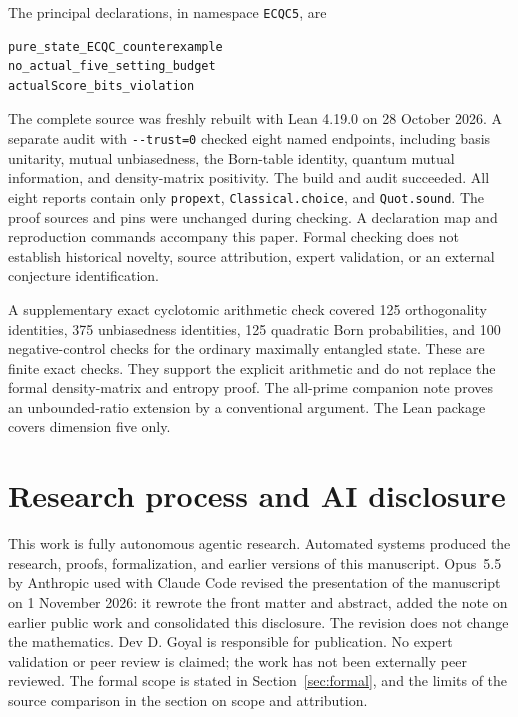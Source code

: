 \documentclass[11pt,a4paper]{article}
\begin{document}
The principal declarations, in namespace \texttt{ECQC5}, are
\begin{verbatim}
pure_state_ECQC_counterexample
no_actual_five_setting_budget
actualScore_bits_violation
\end{verbatim}
The complete source was freshly rebuilt with Lean 4.19.0 on 28 October
2026. A separate audit with \texttt{-{}-trust=0} checked eight named
endpoints, including basis unitarity, mutual unbiasedness, the Born-table
identity, quantum mutual information, and density-matrix positivity.
The build and audit succeeded. All eight reports contain only
\texttt{propext}, \texttt{Classical.choice}, and \texttt{Quot.sound}.
The proof sources and pins were unchanged during checking. A declaration
map and reproduction commands accompany this paper. Formal checking does
not establish historical novelty, source attribution, expert validation,
or an external conjecture identification.

A supplementary exact cyclotomic arithmetic check covered 125 orthogonality
identities, 375 unbiasedness identities, 125 quadratic Born probabilities,
and 100 negative-control checks for the ordinary maximally entangled
state. These are finite exact checks. They support the explicit arithmetic
and do not replace the formal density-matrix and entropy proof.
The all-prime companion note proves an unbounded-ratio extension by a
conventional argument. The Lean package covers dimension five only.

\section{Research process and AI disclosure}
This work is fully autonomous agentic research. Automated systems produced
the research, proofs, formalization, and earlier versions of this
manuscript. Opus~5.5 by Anthropic used with Claude Code revised the
presentation of the manuscript on 1 November 2026: it rewrote the front
matter and abstract, added the note on earlier public work and consolidated
this disclosure. The revision does not change the mathematics. Dev D. Goyal
is responsible for publication. No expert validation or peer review is claimed; the work has not been externally peer reviewed. The formal scope is stated
in Section~\ref{sec:formal}, and the limits of the source comparison in the
section on scope and attribution.



\end{document}
